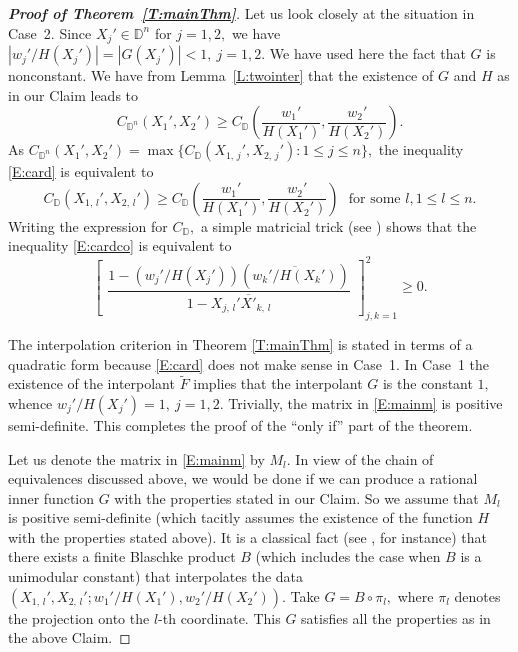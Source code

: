 \documentclass[11pt, reqno]{amsart}
\numberwithin{equation}{section}
\theoremstyle{definition}
\theoremstyle{remark}
\theoremstyle{plain}
\begin{document}
\begin{proof}[{\bf Proof of Theorem~\ref{T:mainThm}}]
Let us look closely at the situation in Case~2. Since $X_j'\in{\mathbb{D}}^n$ for $j=1,2,$
we have $|{w_j'}/{H(X_j')}|=|G(X_j')|<1,\ j=1,2.$
We have used here the fact that $G$ is nonconstant. We have from Lemma~\ref{L:twointer} that the 
existence of $G$ and $H$ as in our Claim leads to
\begin{equation}
C_{{\mathbb{D}}^n}(X_1',X_2')\geq C_{\mathbb{D}}\left(\frac{w_1'}{H(X_1')},\frac{w_2'}{H(X_2')}\right). \label{E:card}
\end{equation}
As $C_{{\mathbb{D}}^n}(X_1',X_2')=\max\{C_{\mathbb{D}}(X_{1,\,j}',X_{2,\,j}'):1\leq j\leq n\},$
the inequality \eqref{E:card} is equivalent to 
\begin{equation}
C_{\mathbb{D}}(X_{1,\,l}',X_{2,\,l}')\geq C_{\mathbb{D}}\left(\frac{w_1'}{H(X_1')},\frac{w_2'}{H(X_2')}\right)
\ \ \ \text{for some $l,1\leq l\leq n.$}\label{E:cardco}
\end{equation}
Writing the expression for $C_{\mathbb{D}},$ a simple matricial trick (see \cite[page 7]{garnett:ftp07})
shows that the inequality \eqref{E:cardco} is equivalent to
\begin{equation}
{\begin{bmatrix}
\dfrac{1-({w_j'}/{H(X_j')})(\overline{{w_k'}/{H(X_k')}})}{1-X_{j,\,l}'\overline{X'}_{k,\,l}}
\end{bmatrix}}_{j,k=1}^{2}
\geq 0.\label{E:mainm}
\end{equation}
\smallskip

The interpolation criterion in Theorem \ref{T:mainThm} is stated in terms of a quadratic form because \eqref{E:card} does not
make sense in Case~1. In Case~1 the existence of the interpolant $\widetilde{F}$ implies that the interpolant $G$ is 
the constant $1,$ whence $w_j'/H(X_j')=1,\ j=1,2.$ Trivially, the matrix in \eqref{E:mainm} is positive semi-definite.
This completes the proof of the ``only if'' part of the theorem.
\smallskip

Let us denote the matrix in \eqref{E:mainm} by $M_l.$ In view of the chain of equivalences discussed above,
we would be done if we can produce a rational inner function $G$ with the properties stated in our Claim.
So we assume that $M_l$ is positive semi-definite (which tacitly assumes the existence of the function $H$
with the properties stated above). It is a classical fact (see \cite[Theorem 6.15]{agmac:ftp02}, for instance) 
that there exists a finite Blaschke product $B$ (which includes the case when $B$ is a unimodular constant)
that interpolates the data $(X_{1,\,l}',X_{2,\,l}';w_1'/H(X_1'),w_2'/H(X_2')).$ Take $G=B\circ \pi_l,$ where $\pi_l$ 
denotes the projection onto the $l$-th coordinate. This $G$ satisfies all the properties as in the above Claim.
\smallskip


\end{proof}
\end{document}
